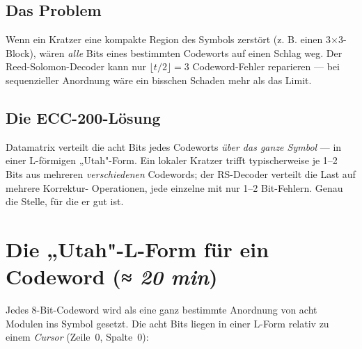 \subsection*{Das Problem}

Wenn ein Kratzer eine kompakte Region des Symbols zerstört (z. B.
einen 3$\times$3-Block), wären \emph{alle} Bits eines bestimmten
Codeworts auf einen Schlag weg. Der Reed-Solomon-Decoder kann nur
$\lfloor t/2 \rfloor = 3$ Codeword-Fehler reparieren — bei sequenzieller
Anordnung wäre ein bisschen Schaden mehr als das Limit.

\subsection*{Die ECC-200-Lösung}

Datamatrix verteilt die acht Bits jedes Codeworts \emph{über das ganze
Symbol} — in einer L-förmigen „Utah"-Form. Ein lokaler Kratzer trifft
typischerweise je 1--2 Bits aus mehreren \emph{verschiedenen}
Codewords; der RS-Decoder verteilt die Last auf mehrere Korrektur-
Operationen, jede einzelne mit nur 1--2 Bit-Fehlern. Genau die Stelle,
für die er gut ist.

\section{Die „Utah"-L-Form für ein Codeword \normalfont(\textit{≈ 20 min})}

Jedes 8-Bit-Codeword wird als eine ganz bestimmte Anordnung von acht
Modulen ins Symbol gesetzt. Die acht Bits liegen in einer L-Form
relativ zu einem \emph{Cursor} (Zeile~$0$, Spalte~$0$):

